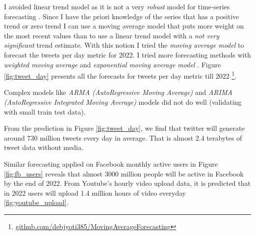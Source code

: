 I avoided linear trend model as it is not a very {\em robust} model for time-series forecasting \cite{nau2014review}. Since I have the
priori knowledge of the series that has a positive trend or zero trend I can use a moving
average model that puts more weight on the most recent values than to use a linear trend model
with a {\em not very significant} trend estimate. With this notion I tried the {\em moving average model} to forecast the tweets per day metric for 2022. I tried more forecasting methods with {\em weighted moving average} and {\em exponential moving average model }. Figure \ref{fig:tweet_day} presents all the forecasts for tweets per day metric till 2022 \footnote{\href{https://github.com/debjyoti385/MovingAverageForecasting}{github.com/debjyoti385/MovingAverageForecasting}}.

Complex models like {\em ARMA (AutoRegressive Moving Average)} and {\em ARIMA (AutoRegressive  Integrated Moving Average)} models  did not do well (validating with small train test data).

From the prediction in Figure \ref{fig:tweet_day}, we find that twitter will generate around 730 million tweets every day in average. That is almost 2.4 terabytes of tweet data without media.

Similar forecasting applied on Facebook monthly active users in Figure \ref{fig:fb_users} reveals that almost 3000 million people will be active in Facebook by the end of 2022. From Youtube's hourly video upload data, it is predicted that in 2022 users will upload 1.4 million hours of video everyday \ref{fig:youtube_upload}.




